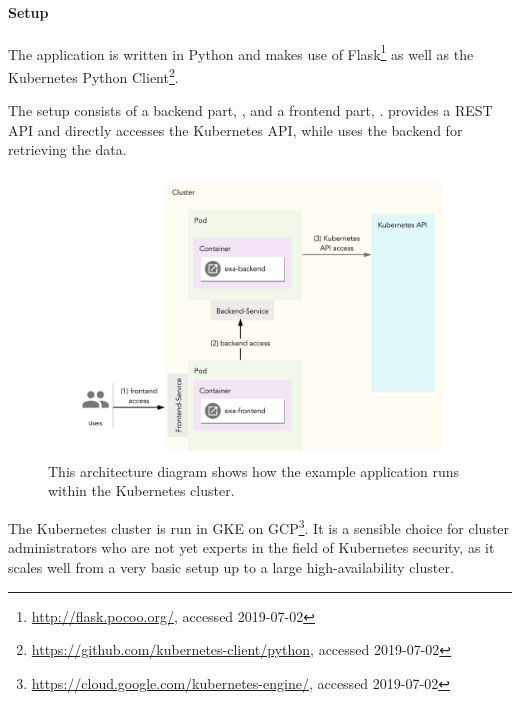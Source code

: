 \paragraph{Setup}

The application is written in Python and makes use of Flask\footnote{\url{http://flask.pocoo.org/}, accessed 2019-07-02} as well as the Kubernetes Python Client\footnote{\url{https://github.com/kubernetes-client/python}, accessed 2019-07-02}. 

The setup consists of a backend part, , and a frontend part, .  provides a REST API and directly accesses the Kubernetes API, while  uses the backend for retrieving the data. 

\begin{figure}[H]
\begin{center}
    \includegraphics[width=1.0\linewidth]{figures/exa_architecture.pdf}
    \caption[Architecture of the example application]{This architecture diagram shows how the example application runs within the Kubernetes cluster.}
    \label{fig:exaArchitecture}
\end{center}
\end{figure}


The Kubernetes cluster is run in \ac{GKE} on \ac{GCP}\footnote{\url{https://cloud.google.com/kubernetes-engine/}, accessed 2019-07-02}. It is a sensible choice for cluster administrators who are not yet experts in the field of Kubernetes security, as it scales well from a very basic setup up to a large high-availability cluster. 

